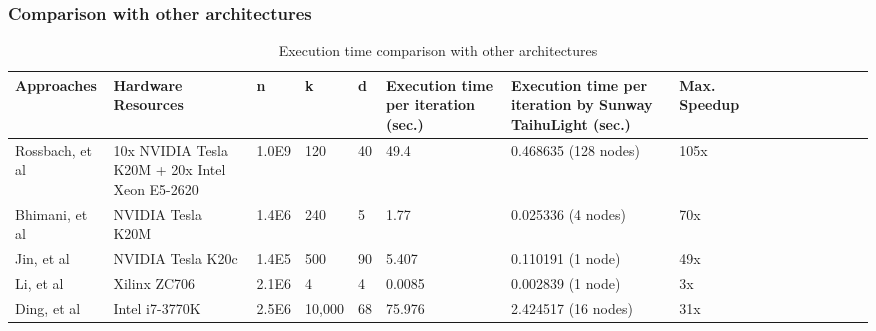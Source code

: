 \documentclass[10pt,journal,compsoc]{IEEEtran}
\begin{document}

\subsubsection{Comparison with other architectures}

\begin{table}
  \caption{Execution time comparison with other architectures}
  \center
  \label{ccpu}
   \begin{tabular}{p{2cm} p{3.2cm} p{1cm} p{1cm}p{0.5cm}p{2cm}p{3cm}p{1cm}p{1cm} c c c c c c c }
    \hline
    Approaches&Hardware Resources &n & k & d& Execution time per iteration (sec.) & Execution time per iteration by Sunway TaihuLight (sec.) & Max. Speedup\\
    \hline
    Rossbach, et al\cite{rossbach2013dandelion} &10x NVIDIA Tesla K20M + 20x Intel Xeon E5-2620&1.0E9 &120 &40 &49.4&0.468635 (128 nodes) & 105x\\
      \hline
    Bhimani, et al\cite{bhimani2015accelerating} &NVIDIA Tesla K20M&1.4E6 &240 &5 &1.77&0.025336 (4 nodes) & 70x\\
      \hline
    Jin, et al\cite{jin2018high} &NVIDIA Tesla K20c&1.4E5&500&90&5.407&0.110191 (1 node) & 49x\\ 
      \hline
    Li, et al\cite{li2016high}&Xilinx ZC706&2.1E6&4&4&0.0085&0.002839 (1 node) & 3x\\
      \hline
    Ding, et al\cite{ding2015yinyang} &Intel i7-3770K&2.5E6 &10,000 &68 &75.976&2.424517 (16 nodes) & 31x\\

    \hline
  \end{tabular}
\end{table}
\end{document}
